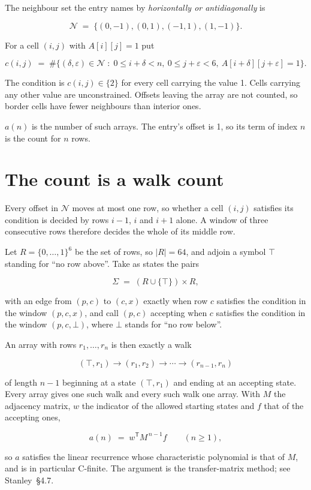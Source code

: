 \documentclass[11pt]{article}
\theoremstyle{definition}
\begin{document}
The neighbour set the entry names by {\itshape horizontally or antidiagonally} is

\[\mathcal{N} \;=\; \{(0,-1), (0,1), (-1,1), (1,-1)\}.\]

For a cell $(i,j)$ with $A[i][j] = 1$ put

\[c(i,j) \;=\; \#\bigl\{(\delta,\varepsilon)\in\mathcal{N} \;:\; 0\le i+\delta<n,\ 0\le j+\varepsilon<6,\ A[i+\delta][j+\varepsilon] = 1\bigr\}.\]

The condition is $c(i,j) \in \{2\}$ for every cell carrying the value 1. Cells carrying any other value are unconstrained. Offsets leaving the array are not counted, so border cells have fewer neighbours than interior ones.

$a(n)$ is the number of such arrays. The entry's offset is 1, so its term of index $n$ is the count for $n$ rows.

\section{The count is a walk count}

Every offset in $\mathcal{N}$ moves at most one row, so whether a cell $(i,j)$ satisfies its condition is decided by rows $i-1$, $i$ and $i+1$ alone. A window of three consecutive rows therefore decides the whole of its middle row.

Let $R = \{0,\dots,1\}^{6}$ be the set of rows, so $|R| = 64$, and adjoin a symbol $\top$ standing for ``no row above''. Take as states the pairs

\[\Sigma \;=\; (R \cup \{\top\}) \times R,\]

with an edge from $(p,c)$ to $(c,x)$ exactly when row $c$ satisfies the condition in the window $(p,c,x)$, and call $(p,c)$ accepting when $c$ satisfies the condition in the window $(p,c,\bot)$, where $\bot$ stands for ``no row below''.

An array with rows $r_1,\dots,r_n$ is then exactly a walk

\[(\top,r_1) \to (r_1,r_2) \to \cdots \to (r_{n-1},r_n)\]

of length $n-1$ beginning at a state $(\top,r_1)$ and ending at an accepting state. Every array gives one such walk and every such walk one array. With $M$ the adjacency matrix, $w$ the indicator of the allowed starting states and $f$ that of the accepting ones,

\[a(n) \;=\; w^{\mathsf T} M^{\,n-1} f \qquad (n \ge 1),\]

so $a$ satisfies the linear recurrence whose characteristic polynomial is that of $M$, and is in particular C-finite. The argument is the transfer-matrix method; see Stanley~\S4.7.
\end{document}
